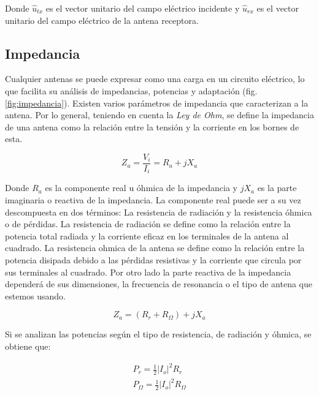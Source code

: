 \par Donde $\hat{u}_{tx}$ es el vector unitario del campo eléctrico incidente y $\hat{u}_{rx}$ es el vector unitario del campo eléctrico de la antena receptora. 

\subsection{Impedancia}

\par Cualquier antenas se puede expresar como una carga en un circuito eléctrico, lo que facilita su análisis de impedancias, potencias y adaptación (fig. \ref{fig:impedancia}). Existen varios parámetros de impedancia que caracterizan a la antena. Por lo general, teniendo en cuenta la \textit{Ley de Ohm}, se define la impedancia de una antena como la relación entre la tensión y la corriente en los bornes de esta. 

\begin{equation}
	Z_{a}=\frac{V_{i}}{I_{i}}=R_{a}+jX_{a}
	\label{eq:impendaciaantena}
\end{equation}

\par Donde $R_{a}$ es la componente real u óhmica de la impedancia y $jX_{a}$ es la parte imaginaria o reactiva de la impedancia. La componente real puede ser a su vez descompuesta en dos términos: La resistencia de radiación y la resistencia óhmica o de pérdidas. La resistencia de radiación se define como la relación entre la potencia total radiada y la corriente eficaz en los terminales de la antena al cuadrado. La resistencia ohmica de la antena se define como la relación entre la potencia disipada debido a las pérdidas resistivas y la corriente que circula por sus terminales al cuadrado. Por otro lado la parte reactiva de la impedancia dependerá de sus dimensiones, la frecuencia de resonancia o el tipo de antena que estemos usando.

\begin{equation}
	Z_{a}=(R_{r}+R_{\Omega})+jX_{a}
	\label{eq:impendaciaantenatotal}
\end{equation}

\par Si se analizan las potencias según el tipo de resistencia, de radiación y óhmica, se obtiene que:

\begin{subequations}
	\begin{eqnarray}
		P_{r}=\frac{1}{2}\left | I_{o}  \right |^{2}R_{r} \label{ecu:potenciarad} \\ %
		P_{\Omega}=\frac{1}{2}\left | I_{o}  \right |^{2}R_{\Omega} \label{ecu:potenciaohm} 
	\end{eqnarray}
\end{subequations}

